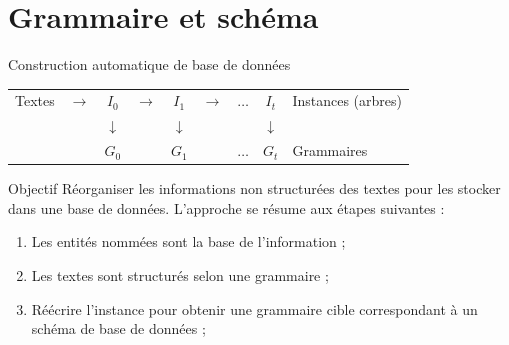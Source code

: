 \section{Grammaire et schéma}

\begin{frame}{Construction automatique de base de données}
    \centering
    \begin{adjustbox}{max width=.8\linewidth}
        \begin{tabular}{cccccccc|l}
            Textes & $\rightarrow$ & $I_0$        & $\rightarrow$ & $ I_1$       & $\rightarrow$ & $ \dots$ & $I_t$        & Instances (arbres) \\
                   &               & $\downarrow$ &               & $\downarrow$ &               &          & $\downarrow$ &                    \\
                   &               & $G_0$        &               & $G_1$        &               & $ \dots$ & $G_t$        & Grammaires         \\
        \end{tabular}
    \end{adjustbox}

    \vfill

    \begin{block}{Objectif}
        Réorganiser les informations non structurées des textes pour les stocker dans une base de données.
        L'approche se résume aux étapes suivantes :
        \begin{enumerate}
            \item Les entités nommées sont la base de l'information ;
            \item Les textes sont structurés selon une grammaire ;
            \item Réécrire l'instance pour obtenir une grammaire cible correspondant à un schéma de base de données ;
        \end{enumerate}
    \end{block}
\end{frame}

